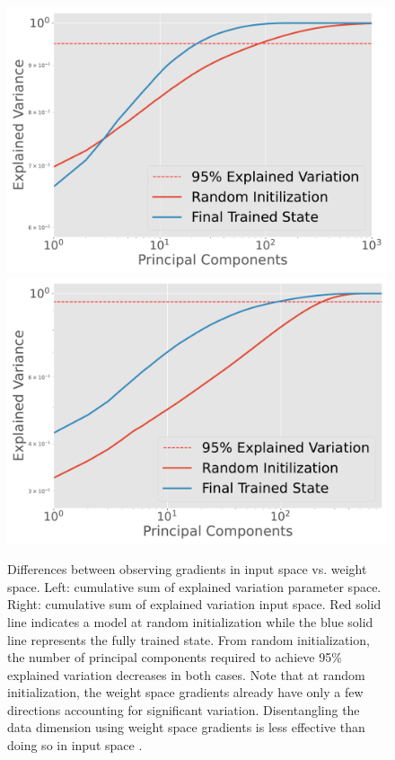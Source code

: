 \begin{figure}[t]
    \centering
    \includegraphics[width=.45\textwidth]{c4a_figures/dimension_change_weightspace.pdf}
    \includegraphics[width=.45\textwidth]{c4a_figures/dimension_change.pdf}
    \caption{Differences between observing gradients in input space vs. weight space. Left: cumulative sum of explained variation parameter space. Right: cumulative sum of explained variation input space. Red solid line indicates a model at random initialization while the blue solid line represents the fully trained state. From random initialization, the number of principal components required to achieve 95\% explained variation decreases in both cases. Note that at random initialization, the weight space gradients already have only a few directions accounting for significant variation. Disentangling the data dimension using weight space gradients is less effective than doing so in input space \citep{shamir2021dimpled}.}
    \label{fig:compare}
\end{figure}
